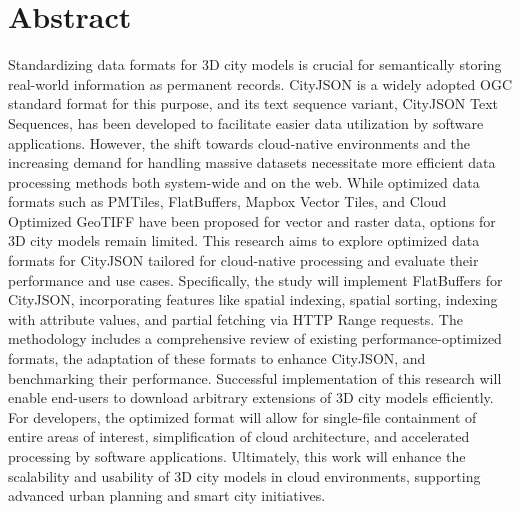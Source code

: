 
\chapter*{Abstract}

Standardizing data formats for 3D city models is crucial for semantically storing real-world information as permanent records. CityJSON is a widely adopted OGC standard format for this purpose, and its text sequence variant, CityJSON Text Sequences, has been developed to facilitate easier data utilization by software applications. However, the shift towards cloud-native environments and the increasing demand for handling massive datasets necessitate more efficient data processing methods both system-wide and on the web. While optimized data formats such as PMTiles, FlatBuffers, Mapbox Vector Tiles, and Cloud Optimized GeoTIFF have been proposed for vector and raster data, options for 3D city models remain limited. This research aims to explore optimized data formats for CityJSON tailored for cloud-native processing and evaluate their performance and use cases. Specifically, the study will implement FlatBuffers for CityJSON, incorporating features like spatial indexing, spatial sorting, indexing with attribute values, and partial fetching via HTTP Range requests. The methodology includes a comprehensive review of existing performance-optimized formats, the adaptation of these formats to enhance CityJSON, and benchmarking their performance. Successful implementation of this research will enable end-users to download arbitrary extensions of 3D city models efficiently. For developers, the optimized format will allow for single-file containment of entire areas of interest, simplification of cloud architecture, and accelerated processing by software applications. Ultimately, this work will enhance the scalability and usability of 3D city models in cloud environments, supporting advanced urban planning and smart city initiatives.